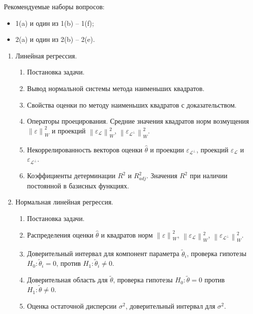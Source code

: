 \documentclass[a4paper,12pt]{article}
\newcommand{\norm}[1]{\left \| #1 \right \|}
\newcommand{\pr}[2]{#1_\mathcal{#2}}
\newcommand{\pro}[2]{#1_{\mathcal{#2}^\perp}}
\begin{document}
Рекомендуемые наборы вопросов:
\begin{itemize}
    \item 1(a) и один из 1(b) -- 1(f);
    \item 2(a) и один из 2(b) -- 2(e).
\end{itemize}

\begin{enumerate}
    \item Линейная регрессия.
        \begin{enumerate}
            \item Постановка задачи.
            \item Вывод нормальной системы метода наименьших квадратов.
            \item Свойства оценки по методу наименьших квадратов с доказательством.
            \item Операторы проецирования. Средние значения квадратов норм возмущения $\norm{\varepsilon}_W^2$ и проекций
                $\norm{\pr{\varepsilon}{L}}_W^2$, $\norm{\pro{\varepsilon}{L}}_W^2$.
            \item Некоррелированность векторов оценки $\widehat{\theta}$ и проекции $\pro{\varepsilon}{L}$, проекций $\pr{\varepsilon}{L}$
                и $\pro{\varepsilon}{L}$.
            \item Коэффициенты детерминации $R^2$ и $R_{adj}^2$. Значения $R^2$ при наличии постоянной в базисных функциях.
        \end{enumerate}
    \item Нормальная линейная регрессия.
        \begin{enumerate}
            \item Постановка задачи.
            \item Распределения оценки $\widehat{\theta}$ и квадратов норм $\norm{\varepsilon}_W^2$, $\norm{\pr{\varepsilon}{L}}_W^2$,
               $\norm{\pro{\varepsilon}{L}}_W^2$.
            \item Доверительный интервал для компонент параметра $\widetilde{\theta}_i$, проверка гипотезы $H_0: \widetilde{\theta}_i = 0$,
                против $H_1: \widetilde{\theta}_i \neq 0$.
            \item Доверительная область для $\widetilde{\theta}$, проверка гипотезы $H_0: \widetilde{\theta} = 0$ против
                $H_1: \widetilde{\theta} \neq 0$.
            \item Оценка остаточной дисперсии $\sigma^2$, доверительный интервал для $\sigma^2$.
        \end{enumerate}
\end{enumerate}
\end{document}

